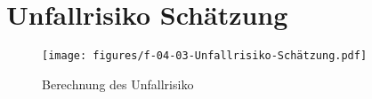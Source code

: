 




%

%

%

\newpage
\printbibliography[heading=bibintoc, title=Literaturverzeichnis]



\appendix
{}
\label{chap:Anhang}

\section{Unfallrisiko Schätzung}
\label{subsec:Unfallrisiko}
\begin{figure}[h!]
	\centering
	\texttt{[image: figures/f-04-03-Unfallrisiko-Schätzung.pdf]}
	\caption[Unfallrisiko Schätzung]{Berechnung des Unfallrisiko}
	\label{img:Unfallrisiko}
\end{figure}

\printindex



